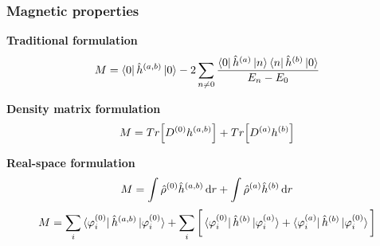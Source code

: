\begin{frame}
    \frametitle{Magnetic properties}
    \centering
    \textbf{Traditional formulation}
    \begin{equation}
        \nonumber
        M = \bra{0}\hat{h}^{(a,b)}\ket{0} - 2\sum_{n \neq 0}
        \frac{\bra{0}\hat{h}^{(a)}\ket{n}\bra{n}\hat{h}^{(b)}\ket{0}}
        {E_n - E_0}
    \end{equation}

    \vspace{7mm}

    \textbf{Density matrix formulation}
    \begin{equation}
        \nonumber
        M = Tr\Big[D^{(0)}h^{(a,b)}\Big] + Tr\Big[D^{(a)}h^{(b)}\Big]
    \end{equation}

    \vspace{7mm}

    \textbf{Real-space formulation}
    \begin{equation}
        \nonumber
        M = 
        \int \hat{\rho}^{(0)}\hat{h}^{(a,b)} \,\mathrm{d} r +
        \int \hat{\rho}^{(a)}\hat{h}^{(b)} \,\mathrm{d} r
    \end{equation}
    \pause
    \begin{equation}
        \nonumber
    M = \sum_i
        \bra{\varphi_i^{(0)}}\hat{h}^{(a,b)}\ket{\varphi_i^{(0)}} 
        + \sum_i \bigg[
        \bra{\varphi_i^{(0)}}\hat{h}^{(b)}\ket{\varphi_i^{(a)}} +
        \bra{\varphi_i^{(a)}}\hat{h}^{(b)}\ket{\varphi_i^{(0)}}
        \bigg]
    \end{equation}
\end{frame}

